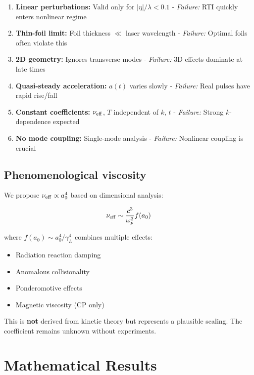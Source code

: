 \documentclass[aps,pre,twocolumn,showpacs,superscriptaddress]{revtex4-2}
\theoremstyle{definition}
\begin{document}
\begin{enumerate}
\item \textbf{Linear perturbations:} Valid only for $|\eta|/\lambda < 0.1$
   - \textit{Failure:} RTI quickly enters nonlinear regime
   
\item \textbf{Thin-foil limit:} Foil thickness $\ll$ laser wavelength
   - \textit{Failure:} Optimal foils often violate this
   
\item \textbf{2D geometry:} Ignores transverse modes
   - \textit{Failure:} 3D effects dominate at late times
   
\item \textbf{Quasi-steady acceleration:} $a(t)$ varies slowly
   - \textit{Failure:} Real pulses have rapid rise/fall
   
\item \textbf{Constant coefficients:} $\nu_{\rm eff}$, $T$ independent of $k$, $t$
   - \textit{Failure:} Strong $k$-dependence expected
   
\item \textbf{No mode coupling:} Single-mode analysis
   - \textit{Failure:} Nonlinear coupling is crucial
\end{enumerate}

\subsection{Phenomenological viscosity}

We propose $\nu_{\rm eff} \propto a_0^4$ based on dimensional analysis:

\begin{equation}
\nu_{\rm eff} \sim \frac{c^3}{\omega_p^2} f(a_0)
\end{equation}

where $f(a_0) \sim a_0^4/\gamma_L^4$ combines multiple effects:
\begin{itemize}
\item Radiation reaction damping
\item Anomalous collisionality
\item Ponderomotive effects
\item Magnetic viscosity (CP only)
\end{itemize}

This is \textbf{not} derived from kinetic theory but represents a plausible scaling. The coefficient remains unknown without experiments.

\section{Mathematical Results}\label{sec:math}
\end{document}
